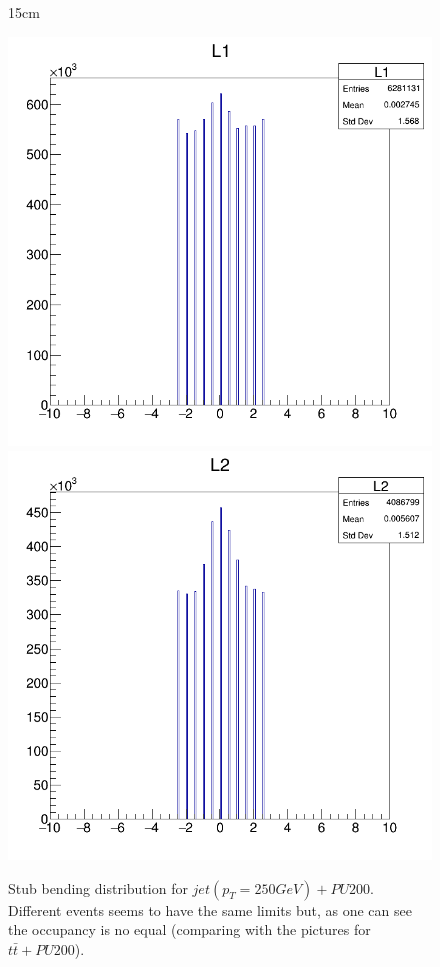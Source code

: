 \begin{figure}[htbp]{15cm}
	\caption{Stub bending distribution for $jet(p_{T}=250GeV)+PU200$. Different events seems to have the same limits but, as one can see the occupancy is no equal (comparing with the pictures for $t\bar{t}+PU200$).}
	\centering
	\includegraphics[scale=0.19]{AppendixCMSL1TT/figs/JetPt250_PU200_deltaS_l1}
	\includegraphics[scale=0.19]{AppendixCMSL1TT/figs/JetPt250_PU200_deltaS_l2}

\end{figure}
